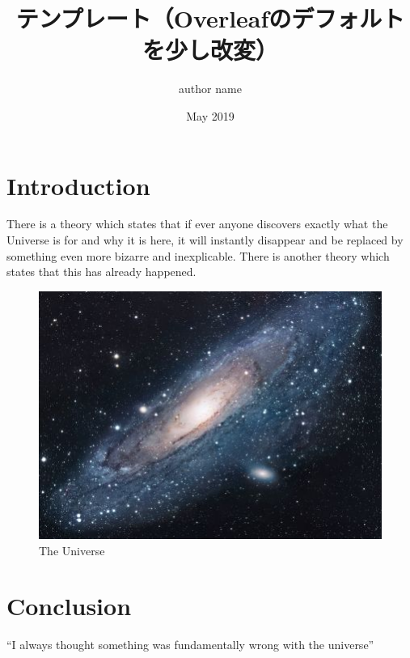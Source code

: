 \documentclass[uplatex,dvipdfmx]{jsarticle}
\title{テンプレート（Overleafのデフォルトを少し改変）}
\author{author name}
\date{May 2019}
\begin{document}
\maketitle

\section{Introduction}
There is a theory which states that if ever anyone discovers exactly what the Universe is for and why it is here, it will instantly disappear and be replaced by something even more bizarre and inexplicable.
There is another theory which states that this has already happened.

\begin{figure}[h!]
\centering
\includegraphics[scale=1.7]{universe}
\caption{The Universe}
\label{fig:universe}
\end{figure}

\section{Conclusion}
``I always thought something was fundamentally wrong with the universe'' \citep{adams1995hitchhiker}



\end{document}
